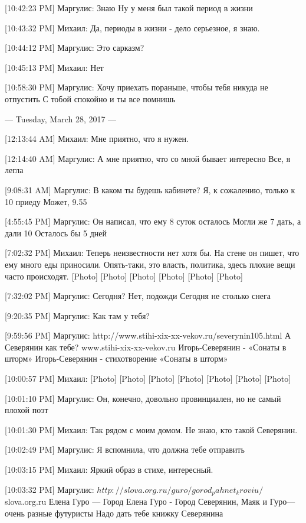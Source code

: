 \documentclass{article}
\begin{document}
[10:42:23 PM] Маргулис:
Знаю
 Ну у меня был такой период в жизни

[10:43:32 PM] Михаил:
Да, периоды в жизни - дело серьезное, я знаю.

[10:44:12 PM] Маргулис:
Это сарказм?

[10:45:13 PM] Михаил:
Нет

[10:58:30 PM] Маргулис:
Хочу приехать пораньше, чтобы тебя никуда не отпустить
 С тобой спокойно и ты все помнишь

--- Tuesday, March 28, 2017 ---

[12:13:44 AM] Михаил:
Мне приятно, что я нужен.

[12:14:40 AM] Маргулис:
А мне приятно, что со мной бывает интересно
 Все, я легла

[9:08:31 AM] Маргулис:
В каком ты будешь кабинете?
 Я, к сожалению, только к 10 приеду
 Может, 9.55

[4:55:45 PM] Маргулис:
Он написал, что ему 8 суток осталось
 Могли же 7 дать, а дали 10
 Осталось бы 5 дней

[7:02:32 PM] Михаил:
Теперь неизвестности нет хотя бы. На стене он пишет, что ему много еды приносили. Опять-таки, это власть, политика, здесь плохие вещи часто происходят.
 [Photo]
 [Photo]
 [Photo]
 [Photo]
 [Photo]
 [Photo]

[7:32:02 PM] Маргулис:
Сегодня?
 Нет, подожди
 Сегодня не столько снега

[9:20:35 PM] Маргулис:
Как там у тебя?

[9:59:56 PM] Маргулис:
http://www.stihi-xix-xx-vekov.ru/severynin105.html
А Северянин как тебе?
www.stihi-xix-xx-vekov.ru
Игорь-Северянин - «Сонаты в шторм»
Игорь-Северянин - стихотворение «Сонаты в шторм»

[10:00:57 PM] Михаил:
[Photo]
 [Photo]
 [Photo]
 [Photo]
 [Photo]
 [Photo]
 [Photo]

[10:01:10 PM] Маргулис:
Он, конечно, довольно провинциален, но не самый плохой поэт

[10:01:30 PM] Михаил:
Так рядом с моим домом. Не знаю, кто такой Северянин.

[10:02:49 PM] Маргулис:
Я вспомнила, что должна тебе отправить

[10:03:15 PM] Михаил:
Яркий образ в стихе, интересный.

[10:03:32 PM] Маргулис:
$http://slova.org.ru/guro/gorod_pahnet_kroviu/$
slova.org.ru
Елена Гуро — Город
Елена Гуро - Город
 Северянин, Маяк и Гуро—очень разные футуристы
 Надо дать тебе книжку Северянина
\end{document}
